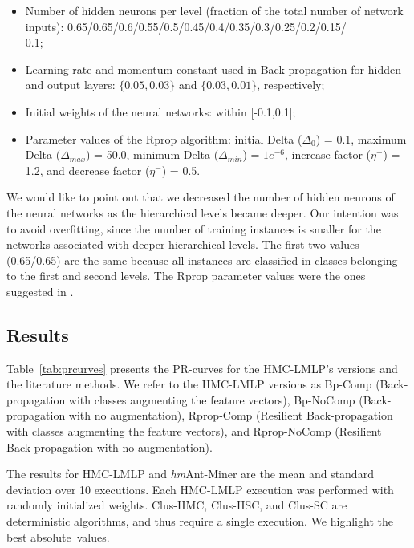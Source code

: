 \begin{itemize}
    \sloppy
	\item Number of hidden neurons per level (fraction of the total number of network inputs): 0.65/0.65/0.6/0.55/0.5/0.45/0.4/0.35/0.3/0.25/0.2/0.15/\\0.1;
	
	\item Learning rate and momentum constant used in Back-propagation for hidden and output layers: $\{0.05, 0.03\}$ and $\{0.03, 0.01\}$, respectively;

	\item Initial weights of the neural networks: within [-0.1,0.1];
	
	\item Parameter values of the Rprop algorithm: initial Delta ($\Delta_0$) = 0.1, maximum Delta ($\Delta_{max}$) = 50.0, minimum Delta ($\Delta_{min}$) = $1e^{-6}$, increase factor ($\eta^+$) = 1.2, and decrease factor ($\eta^-$) = 0.5. 
\end{itemize}

We would like to point out that we decreased the number of hidden neurons of the neural networks as the hierarchical levels became deeper. Our intention was to avoid overfitting, since the number of training instances is smaller for the networks associated with deeper hierarchical levels. The first two values (0.65/0.65) are the same because all instances are classified in classes belonging to the first and second levels. The Rprop parameter values were the ones suggested in \cite{Riedmiller1993}.

\subsection{Results}

Table~\ref{tab:prcurves} presents the PR-curves for the HMC-LMLP's versions and the literature methods. We refer to the HMC-LMLP versions as Bp-Comp (Back-propagation with classes augmenting the feature vectors), Bp-NoComp (Back-propagation with no augmentation), Rprop-Comp (Resilient Back-propagation with classes augmenting the feature vectors), and Rprop-NoComp (Resilient Back-propagation with no augmentation).

The results for HMC-LMLP and {\it hm}Ant-Miner are the mean and standard deviation over 10 executions. Each HMC-LMLP execution was performed with randomly initialized weights. Clus-HMC, Clus-HSC, and Clus-SC are deterministic algorithms, and thus require a single execution. We highlight the best absolute~values.

